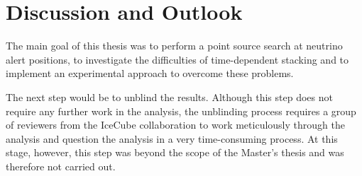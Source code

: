 %

\section{Discussion and Outlook}

The main goal of this thesis was to perform a point source search at neutrino alert positions, to investigate the difficulties of time-dependent stacking and to implement an experimental approach to overcome these problems.

The next step would be to unblind the results.
Although this step does not require any further work in the analysis, the unblinding process requires a group of reviewers from the IceCube collaboration to work meticulously through the analysis and question the analysis in a very time-consuming process.
At this stage, however, this step was beyond the scope of the Master's thesis and was therefore not carried out.

